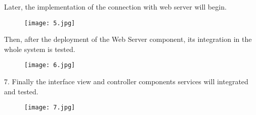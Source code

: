\documentclass[../../main.tex]{subfiles}
\begin{document}
\begin{enumerate}
\begin{minipage}{0.9\textwidth}
	\item Later, the implementation of the connection with web server will begin. 

	\begin{figure}[H]
    \centering
    \texttt{[image: 5.jpg]}
	\end{figure}

	\end{minipage}

	\noindent\begin{minipage}{0.9\textwidth}
		
	\item Then,  after  the  deployment  of  the  Web  Server  component,  its  integration  in  the  whole  system  is tested.

	\begin{figure}[H]
    \centering
    \texttt{[image: 6.jpg]}
	\end{figure}

	\end{minipage}

	\noindent\begin{minipage}{0.9\textwidth}
		
	\item 7. Finally the interface view and controller components services will integrated and tested.

	\begin{figure}[H]
    \centering
    \texttt{[image: 7.jpg]}
	\end{figure}

	\end{minipage}

\end{enumerate}
\end{document}
